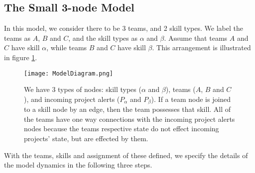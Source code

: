 \subsection{The Small 3-node Model}
\label{sec:3nodemodel}
In this model, we consider there to be 3 teams, and 2 skill types. We label the teams as $A$, $B$ and $C$, and the skill types as $\alpha$ and $\beta$. Assume that teams $A$ and $C$ have skill $\alpha$, while teams $B$ and $C$ have skill $\beta$. This arrangement is illustrated in figure \ref{fig:diagram1}.

\begin{figure}[ht]
	\centering

	\texttt{[image: ModelDiagram.png]}
	\caption{We have 3 types of nodes: skill types ($\alpha$ and $\beta$), teams ($A$, $B$ and $C$), and incoming project alerts ($P_\alpha$ and $P_\beta$). If a team node is joined to a skill node by an edge, then the team possesses that skill. All of the teams have one way connections with the incoming project alerts nodes because the teams respective state do not effect incoming projects' state, but are effected by them.}
	\label{fig:diagram1}
\end{figure}

With the teams, skills and assignment of these defined, we specify the details of the model dynamics in the following three steps.

